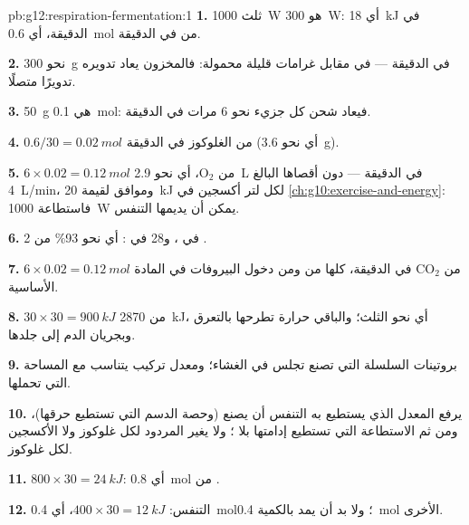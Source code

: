 \begin{solution}{pb:g12:respiration-fermentation:1}
\textbf{1.} ثلث \qty{1000}{W} هو \qty{300}{W}: أي \qty{18}{kJ} في
الدقيقة، أي \qty{0.6}{mol} من  في الدقيقة.

\textbf{2.} نحو \qty{300}{g} في الدقيقة --- في مقابل غرامات قليلة
محمولة: فالمخزون يعاد تدويره تدويرًا متصلًا.

\textbf{3.} \qty{50}{g} هي \qty{0.1}{mol}: فيعاد شحن كل جزيء نحو 6
مرات في الدقيقة.

\textbf{4.} $0.6/30 = \qty{0.02}{mol}$ من الغلوكوز في الدقيقة (أي نحو
\qty{3.6}{g}).

\textbf{5.} $6 \times 0.02 = \qty{0.12}{mol}$ من $\mathrm{O_2}$، أي
نحو \qty{2.9}{L} في الدقيقة --- دون أقصاها البالغ \qty{4}{L/min}،
وموافق لقيمة \qty{20}{kJ} لكل لتر أكسجين في
\cref{ch:g10:exercise-and-energy}: فاستطاعة \qty{1000}{W} يمكن أن
يديمها التنفس.

\textbf{6.} 2 في ، و28 في : أي نحو 93\% من .

\textbf{7.} $6 \times 0.02 = \qty{0.12}{mol}$ من $\mathrm{CO_2}$ في
الدقيقة، كلها من  ومن دخول البيروفات في المادة الأساسية.

\textbf{8.} $30 \times 30 = \qty{900}{kJ}$ من \qty{2870}{kJ}، أي نحو
الثلث؛ والباقي حرارة تطرحها بالتعرق وبجريان الدم إلى جلدها.

\textbf{9.} بروتينات السلسلة  التي تصنع  تجلس في الغشاء؛
ومعدل تركيب  يتناسب مع المساحة التي تحملها.

\textbf{10.} يرفع المعدل الذي يستطيع به التنفس أن يصنع  (وحصة الدسم
التي تستطيع حرقها)، ومن ثم الاستطاعة التي تستطيع إدامتها بلا ؛
ولا يغير المردود لكل غلوكوز ولا الأكسجين لكل غلوكوز.

\textbf{11.} $800 \times 30 = \qty{24}{kJ}$: أي \qty{0.8}{mol} من .

\textbf{12.} التنفس: $400 \times 30 = \qty{12}{kJ}$، أي
\qty{0.4}{mol}؛ ولا بد أن يمد  بالكمية \qty{0.4}{mol} الأخرى.


\end{solution}

